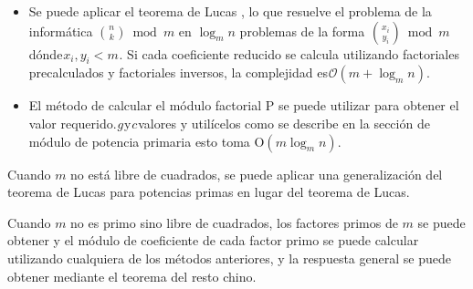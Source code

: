 \begin{itemize}
	\item Se puede aplicar el teorema de Lucas , lo que resuelve el problema de la informática $\binom{n}{k} \bmod m$ en $\log_mn$ problemas de la forma 
	$\binom{x_i}{y_i} \bmod m$ dónde $x_i, y_i <m$ . Si cada coeficiente reducido se calcula utilizando factoriales precalculados y factoriales inversos, la complejidad es $\mathcal{O}(m + \log_m n)$.
	\item El método de calcular el módulo factorial P se puede utilizar para obtener el valor requerido. $g$ y $c$ valores y utilícelos como se describe en la sección de módulo de potencia primaria esto toma O$(m \log_m n)$.
\end{itemize}

Cuando $m$ no está libre de cuadrados, se puede aplicar una generalización del teorema de Lucas para potencias primas en lugar del teorema de Lucas.

Cuando $m$ no es primo sino libre de cuadrados, los factores primos de $m$ se puede obtener y el módulo de coeficiente de cada factor primo se puede calcular utilizando cualquiera de los métodos anteriores, y la respuesta general se puede obtener mediante el teorema del resto chino.


